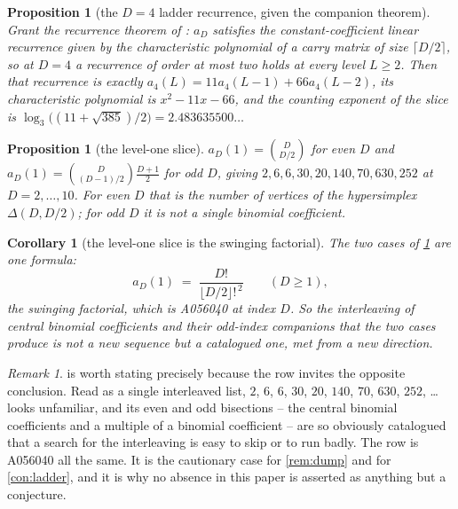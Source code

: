 \documentclass[11pt]{amsart}
\newtheorem{proposition}[theorem]{Proposition}
\newtheorem{corollary}[theorem]{Corollary}
\theoremstyle{definition}
\theoremstyle{remark}
\newtheorem{remark}[theorem]{Remark}
\begin{document}
\begin{proposition}[the $D=4$ ladder recurrence, given the companion theorem]
\label{prop:ladder}
Grant the recurrence theorem of \cite{slicepaper}: $a_{D}$ satisfies the constant-coefficient linear recurrence given by the characteristic polynomial of a carry matrix of size $\lceil D/2 \rceil$, so at $D = 4$ a recurrence of order at most two holds at every level $L \ge 2$. Then that recurrence is exactly $a_{4}(L) = 11a_{4}(L-1)+66a_{4}(L-2)$, its characteristic polynomial is $x^{2}-11x-66$, and the counting exponent of the slice is $\log_{3}\bigl((11+\sqrt{385})/2\bigr) = 2.483635500\ldots$
\end{proposition}

\begin{proposition}[the level-one slice]
\label{prop:level1}
$a_{D}(1) = \binom{D}{D/2}$ for even $D$ and $a_{D}(1) = \binom{D}{(D-1)/2}\frac{D+1}{2}$ for odd $D$, giving $2, 6, 6, 30, 20, 140, 70, 630, 252$ at $D = 2,\dots,10$. For even $D$ that is the number of vertices of the hypersimplex $\Delta(D,D/2)$; for odd $D$ it is not a single binomial coefficient.
\end{proposition}

\begin{corollary}[the level-one slice is the swinging factorial]
\label{cor:swing}
The two cases of \cref{prop:level1} are one formula:
\[
  a_{D}(1) \;=\; \frac{D!}{\lfloor D/2\rfloor!^{\,2}} \qquad (D \ge 1),
\]
the swinging factorial, which is A056040 \cite{a056040} at index $D$. So the interleaving of central binomial coefficients and their odd-index companions that the two cases produce is not a new sequence but a catalogued one, met from a new direction.
\end{corollary}

\begin{remark}
\label{rem:swing}
 is worth stating precisely because the row invites the opposite conclusion. Read as a single interleaved list, $2$, $6$, $6$, $30$, $20$, $140$, $70$, $630$, $252$, \dots{} looks unfamiliar, and its even and odd bisections -- the central binomial coefficients and a multiple of a binomial coefficient -- are so obviously catalogued that a search for the interleaving is easy to skip or to run badly. The row is A056040 all the same. It is the cautionary case for \cref{rem:dump} and for \cref{con:ladder}, and it is why no absence in this paper is asserted as anything but a conjecture.
\end{remark}
\end{document}
